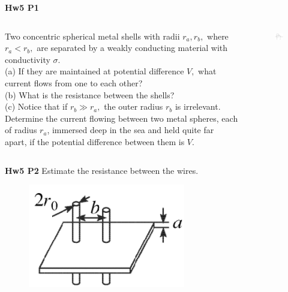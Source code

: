 \documentclass{beamer}
\begin{document}
\begin{frame}{\bf Hw5 P1}
    \begin{columns}
        \begin{column}{.7\linewidth}
            Two concentric spherical metal shells with radii $r_{a}, r_{b},$ 
            where $r_{a}<r_{b},$ are separated by a weakly conducting material 
            with conductivity $\sigma$. \\
            (a) If they are maintained at potential difference $V,$ what current flows from one to each other? \\
            (b) What is the resistance between the shells? \\ 
            (c) Notice that if $r_{b} \gg r_{a},$ the outer radius $r_{b}$ is irrelevant. Determine the current flowing between two metal spheres, each of radius $r_{a}$, immersed deep in the sea and held quite far apart, if the potential difference between them is $V$.
        \end{column}
        \begin{column}{.3\linewidth}
            \begin{figure}
                \centering
                \includegraphics[scale=0.8]{images/HW5_1.png}
            \end{figure}
        \end{column}
    \end{columns}
\end{frame}

\begin{frame}{\bf Hw5 P2}
    Estimate the resistance between the wires.
    \vspace{1em}
    \begin{figure}
        \centering 
        \includegraphics[scale = 1]{images/HW5_2.png}
    \end{figure}
\end{frame}
\end{document}
